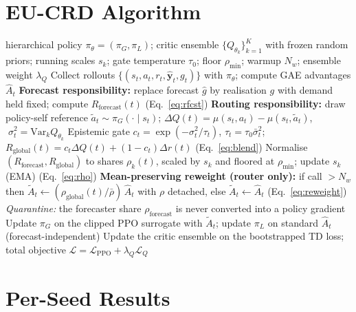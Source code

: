 \section{EU-CRD Algorithm}\label{app:algorithm}
\begin{algorithm}[t]
\caption{EU-CRD training (one PPO iteration)}
\label{alg:eucrd}
\begin{algorithmic}[1]
\REQUIRE hierarchical policy $\pi_\theta=(\pi_G,\pi_L)$; critic ensemble $\{Q_{\theta_k}\}_{k=1}^{K}$ with frozen random priors; running scales $s_k$; gate temperature $\tau_0$; floor $\rho_{\min}$; warmup $N_w$; ensemble weight $\lambda_Q$
\STATE Collect rollouts $\{(s_t,a_t,r_t,\hat{\mathbf{y}}_t,g_t)\}$ with $\pi_\theta$; compute GAE advantages $\hat{A}_t$
  \STATE \textbf{Forecast responsibility:} replace forecast $\hat g$ by realisation $g$ with demand held fixed; compute $R_{\text{forecast}}(t)$ \hfill (Eq.~\ref{eq:rfcst})
  \STATE \textbf{Routing responsibility:} draw policy-self reference $\tilde a_t\!\sim\!\pi_G(\cdot\mid s_t)$; $\Delta Q(t)\!=\!\mu(s_t,a_t)\!-\!\mu(s_t,\tilde a_t)$, $\;\sigma^2_t\!=\!\mathrm{Var}_k Q_{\theta_k}$
  \STATE Epistemic gate $c_t\!=\!\exp(-\sigma^2_t/\tau_t)$, $\tau_t\!=\!\tau_0\bar\sigma^2_t$;\quad $R_{\text{global}}(t)\!=\!c_t\Delta Q(t)+(1\!-\!c_t)\Delta r(t)$ \hfill (Eq.~\ref{eq:blend})
  \STATE Normalise $(R_{\text{forecast}},R_{\text{global}})$ to shares $\rho_k(t)$, scaled by $s_k$ and floored at $\rho_{\min}$; update $s_k$ (EMA) \hfill (Eq.~\ref{eq:rho})
\ENDFOR
\STATE \textbf{Mean-preserving reweight (router only):} if call $>N_w$ then $\tilde A_t\!\leftarrow\!(\rho_{\text{global}}(t)/\bar\rho)\,\hat A_t$ with $\rho$ detached, else $\tilde A_t\!\leftarrow\!\hat A_t$ \hfill (Eq.~\ref{eq:reweight})
\STATE \emph{Quarantine:} the forecaster share $\rho_{\text{forecast}}$ is never converted into a policy gradient
\STATE Update $\pi_G$ on the clipped PPO surrogate with $\tilde A_t$; update $\pi_L$ on standard $\hat A_t$ (forecast-independent)
\STATE Update the critic ensemble on the bootstrapped TD loss; total objective $\mathcal{L}=\mathcal{L}_{\text{PPO}}+\lambda_Q\mathcal{L}_Q$
\end{algorithmic}
\end{algorithm}

\section{Per-Seed Results}
\label{app:perseed}

